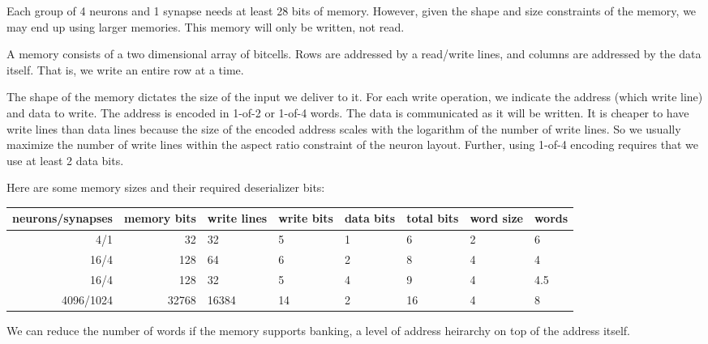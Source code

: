 \documentclass{article}
\begin{document}
Each group of 4 neurons and 1 synapse needs at least 28 bits of memory.
However, given the shape and size constraints of the memory, we may end up using
larger memories. This memory will only be written, not read.

A memory consists of a two dimensional array of bitcells.
Rows are addressed by a read/write lines, and columns are addressed by the 
data itself. That is, we write an entire row at a time.

The shape of the memory dictates the size of the input we deliver to it.
For each write operation, we indicate the address (which write line) and data
to write. The address is encoded in 1-of-2 or 1-of-4 words. The data is communicated
as it will be written. It is cheaper to have write lines than
data lines because the size of the encoded address scales with the logarithm of the
number of write lines. So we usually maximize the number of write lines
within the aspect ratio constraint of the neuron layout. 
Further, using 1-of-4 encoding requires that we use at least 2 data bits.

Here are some memory sizes and their required deserializer bits:

\begin{center}
    \begin{tabular}{|r|r|l|l|l|l|l|l|}
    \hline
    neurons/synapses & memory bits & write lines & write bits & data bits & total bits & word size & words \\ \hline
    4/1 & 32 & 32 & 5 & 1 & 6 & 2 & 6 \\ \hline
    16/4 & 128 & 64 & 6 & 2 & 8 & 4 & 4 \\ \hline
    16/4 & 128 & 32 & 5 & 4 & 9 & 4 & 4.5 \\ \hline
    4096/1024 & 32768 & 16384 & 14 & 2 & 16 & 4 & 8 \\ \hline
    \end{tabular}
\end{center}

\noindent
We can reduce the number of words if the memory supports banking, a 
level of address heirarchy on top of the address itself.

\end{document}
